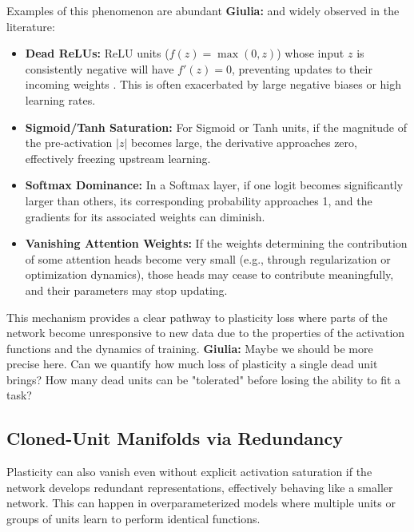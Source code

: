 \documentclass{article}
\newcommand{\giulia}[1]{{\color{ForestGreen}\textbf{Giulia:} #1}}
\begin{document}
Examples of this phenomenon are abundant \giulia{and widely observed in the literature}:
\begin{itemize}
    \item \textbf{Dead ReLUs:} ReLU units ($f(z) = \max(0, z)$) whose input $z$ is consistently negative will have $f'(z)=0$, preventing updates to their incoming weights \cite{nair2010rectified}. This is often exacerbated by large negative biases or high learning rates.
    \item \textbf{Sigmoid/Tanh Saturation:} For Sigmoid or Tanh units, if the magnitude of the pre-activation $|z|$ becomes large, the derivative approaches zero, effectively freezing upstream learning.
    \item \textbf{Softmax Dominance:} In a Softmax layer, if one logit becomes significantly larger than others, its corresponding probability approaches 1, and the gradients for its associated weights can diminish.
    \item \textbf{Vanishing Attention Weights:} If the weights determining the contribution of some attention heads become very small (e.g., through regularization or optimization dynamics), those heads may cease to contribute meaningfully, and their parameters may stop updating.
\end{itemize}
This mechanism provides a clear pathway to plasticity loss where parts of the network become unresponsive to new data due to the properties of the activation functions and the dynamics of training. \giulia{Maybe we should be more precise here. Can we quantify how much loss of plasticity a single dead unit brings? How many dead units can be "tolerated" before losing the ability to fit a task?}


\subsection{Cloned-Unit Manifolds via Redundancy}

Plasticity can also vanish even without explicit activation saturation if the network develops redundant representations, effectively behaving like a smaller network. This can happen in overparameterized models where multiple units or groups of units learn to perform identical functions.
\end{document}
